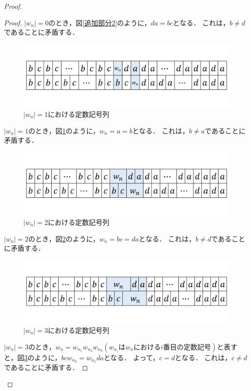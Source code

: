 \begin{proof}
\begin{proof}
$|w_{n}|=0$のとき，図\ref{追加部分2}のように，$da=bc$となる．
これは，$b \not = d$であることに矛盾する．

\begin{figure}[H]
\includegraphics[width=\linewidth]{画像/追加部分3.png}
\caption{$|w_{n}| = 1$における定数記号列}
\label{追加部分3}
\end{figure}

$|w_{n}|=1$のとき，図\ref{追加部分3}のように，$w_{n}=a=b$となる．
これは，$b \not = a$であることに矛盾する．

\begin{figure}[H]
\includegraphics[width=\linewidth]{画像/追加部分4.png}
\caption{$|w_{n}| = 2$における定数記号列}
\label{追加部分4}
\end{figure}

$|w_{n}|=2$のとき，図\ref{追加部分4}のように，$w_{n}=bc=da$となる．
これは，$b \not = d$であることに矛盾する．

\begin{figure}[H]
\includegraphics[width=\linewidth]{画像/追加部分5.png}
\caption{$|w_{n}| = 3$における定数記号列}
\label{追加部分5}
\end{figure}

$|w_{n}|=3$のとき，$w_{n}=w_{n_{1}}w_{n_{2}}w_{n_{3}} (w_{n_{i}}はw_{n}におけるi番目の定数記号)$と表すと，図\ref{追加部分5}のように，$bcw_{n_{3}}=w_{n_{1}}da$となる．
よって，$c=d$となる．
これは，$c \not = d$であることに矛盾する．


\end{proof}
\end{proof}
